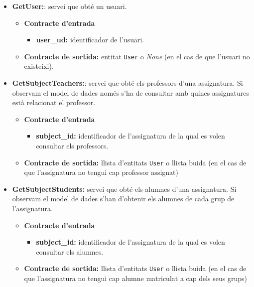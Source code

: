 		\begin{itemize}
		
			\item \textbf{GetUser:}: servei que obté un usuari.
				\begin{itemize}
					\item \textbf{Contracte d'entrada}
						\begin{itemize}
							\item \textbf{user\_ud:} identificador de l'usuari.
						\end{itemize}
					\item \textbf{Contracte de sortida:} entitat \texttt{User} o \emph{None} (en el cas de que l'usuari no existeixi).
				\end{itemize}
		
			\item \textbf{GetSubjectTeachers:}: servei que obté els professors d'una assignatura. Si observam el model de dades només s'ha de consultar amb quines assignatures està relacionat el professor.
				\begin{itemize}
					\item \textbf{Contracte d'entrada}
						\begin{itemize}
							\item \textbf{subject\_id:} identificador de l'assignatura de la qual es volen consultar els professors.
						\end{itemize}
					\item \textbf{Contracte de sortida:} llista d'entitats \texttt{User} o llista buida (en el cas de que l'assignatura no tengui cap professor assignat)
				\end{itemize}
			
			\item \textbf{GetSubjectStudents:} servei que obté els alumnes d'una assignatura. Si observam el model de dades s'han d'obtenir els alumnes de cada grup de l'assignatura.
				\begin{itemize}
					\item \textbf{Contracte d'entrada}
						\begin{itemize}
							\item \textbf{subject\_id:} identificador de l'assignatura de la qual es volen consultar els alumnes.
						\end{itemize}
					\item \textbf{Contracte de sortida:} llista d'entitats \texttt{User} o llista buida (en el cas de que l'assignatura no tengui cap alumne matriculat a cap dels seus grups)
				\end{itemize}
				

\end{itemize}
